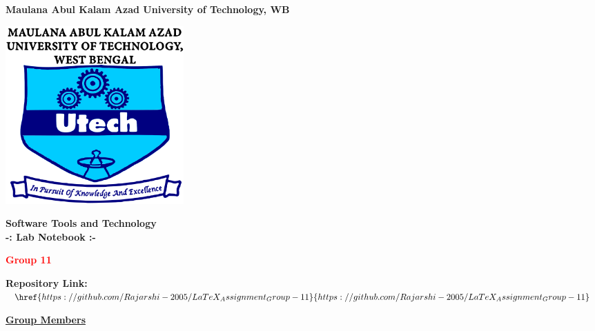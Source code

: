 \documentclass[a4paper,12pt]{article}
\begin{document}
\begin{titlepage}
    \centering
    \vspace*{0 cm}
    \LARGE
    \textbf{Maulana Abul Kalam Azad University of Technology, WB}
    \vspace{0.5cm}
    
    \includegraphics[width=0.3\textwidth]{makaut1.png} %
    \vspace{0.5cm}
    
    \Large
    \textbf{\textcolor{blue!60}{Software Tools and Technology\\
        -: Lab Notebook :-}}
    \vspace{0.5cm}
    
    \large
    \textbf{\textcolor{red}{Group 11}}
    \vspace{0.3 cm}
    
    \textbf{Repository Link:} $\href{https://github.com/Rajarshi-2005/LaTeX_Assignment_Group-11}{https://github.com/Rajarshi-2005/LaTeX_Assignment_Group-11}$
    \vspace{0.3cm}
    
    \textbf{\underline{\textcolor{blue!60}{Group Members}}}
    \vspace{0.3cm}


\end{titlepage}
\end{document}
